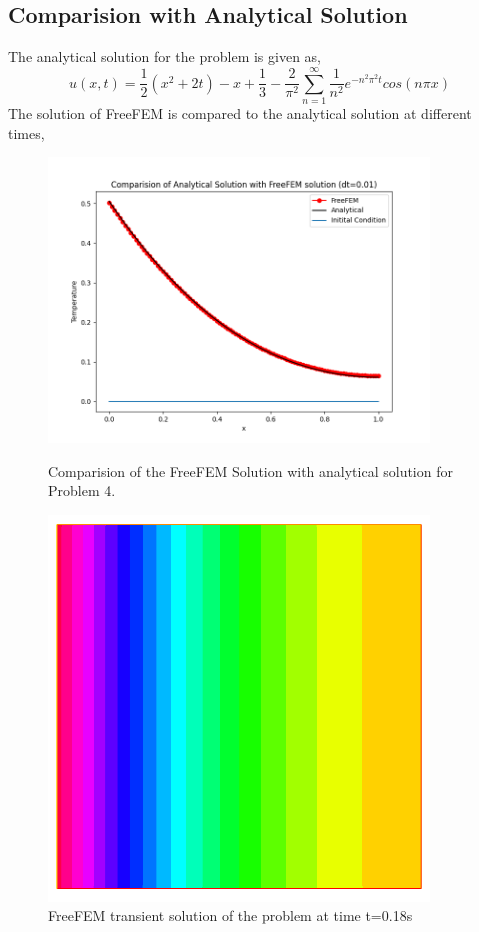 \documentclass[11pt]{article} %
\begin{document}
\subsection{Comparision with Analytical Solution}
The analytical solution for the problem is given as,
\begin{equation}
u(x,t) = \frac{1}{2} (x^2 + 2t) - x + \frac{1}{3} - \frac{2}{\pi^2}\sum_{n=1}^{\infty} \frac{1}{n^2} e^{-n^2 \pi^2 t} cos(n\pi x)
\end{equation}
 The solution of FreeFEM is compared to the analytical solution at different times,
\begin{figure}[H]
\centering
\includegraphics[width=0.9\textwidth]{figures/p42.png}
\caption{Comparision of the FreeFEM Solution with analytical solution for Problem 4.}

\includegraphics[width=0.9\textwidth]{figures/p411.png}
\caption{FreeFEM transient solution of the problem at time t=0.18s}
\end{figure}
\end{document}
